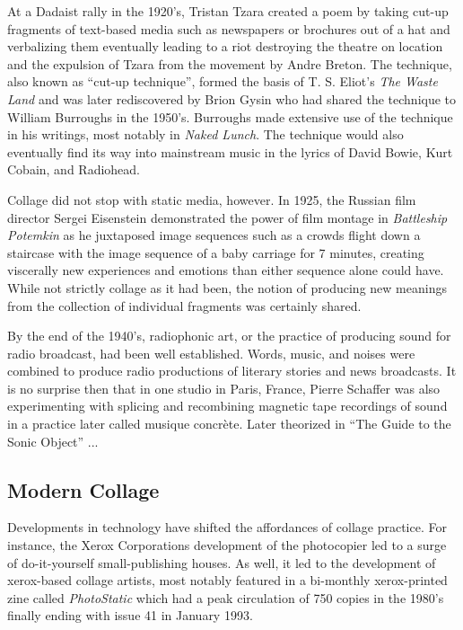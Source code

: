 At a Dadaist rally in the 1920's, Tristan Tzara created a poem by taking cut-up fragments of text-based media such as newspapers or brochures out of a hat and verbalizing them eventually leading to a riot destroying the theatre on location and the expulsion of Tzara from the movement by Andre Breton.  The technique, also known as ``cut-up technique'', formed the basis of T. S. Eliot's \textit{The Waste Land} and was later rediscovered by Brion Gysin who had shared the technique to William Burroughs in the 1950's.  Burroughs made extensive use of the technique in his writings, most notably in \textit{Naked Lunch}.  The technique would also eventually find its way into mainstream music in the lyrics of David Bowie, Kurt Cobain, and Radiohead.  

Collage did not stop with static media, however.  In 1925, the Russian film director Sergei Eisenstein demonstrated the power of film montage in \textit{Battleship Potemkin} as he juxtaposed image sequences such as a crowds flight down a staircase with the image sequence of a baby carriage for 7 minutes, creating viscerally new experiences and emotions than either sequence alone could have.  While not strictly collage as it had been, the notion of producing new meanings from the collection of individual fragments was certainly shared.  

By the end of the 1940's, radiophonic art, or the practice of producing sound for radio broadcast, had been well established.  Words, music, and noises were combined to produce radio productions of literary stories and news broadcasts.  It is no surprise then that in one studio in Paris, France, Pierre Schaffer was also experimenting with splicing and recombining magnetic tape recordings of sound in a practice later called musique concr\`ete.  Later theorized in ``The Guide to the Sonic Object'' ...

\subsection{Modern Collage}
Developments in technology have shifted the affordances of collage practice.  For instance, the Xerox Corporations development of the photocopier led to a surge of do-it-yourself small-publishing houses.  As well, it led to the development of xerox-based collage artists, most notably featured in a bi-monthly xerox-printed zine called \textit{PhotoStatic} which had a peak circulation of 750 copies in the 1980's finally ending with issue 41 in January 1993.

